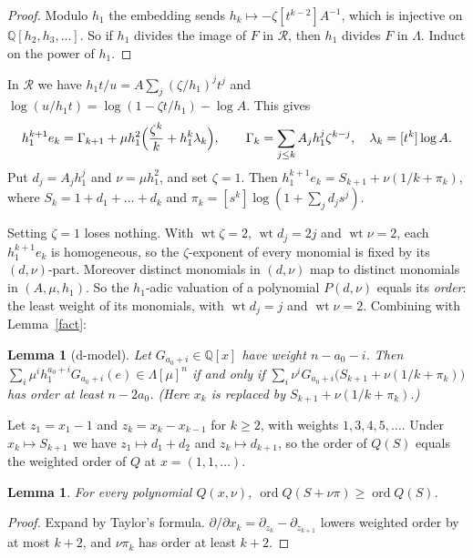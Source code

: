 \documentclass[11pt]{article}
\newtheorem{lemma}[theorem]{Lemma}
\theoremstyle{definition}
\theoremstyle{remark}
\newcommand{\Q}{\mathbb{Q}}
\newcommand{\La}{\Lambda}
\begin{document}
\begin{proof}
Modulo $h_1$ the embedding sends $h_k\mapsto-\zeta[t^{k-2}]A^{-1}$, which is injective on $\Q[h_2,h_3,\dots]$. So if
$h_1$ divides the image of $F$ in $\mathcal R$, then $h_1$ divides $F$ in $\La$. Induct on the power of $h_1$.
\end{proof}

In $\mathcal R$ we have $h_1t/u=A\sum_j(\zeta/h_1)^jt^j$ and $\log(u/h_1t)=\log(1-\zeta t/h_1)-\log A$. This gives
\[
  h_1^{k+1}e_k=\Gamma_{k+1}+\mu h_1^2\Bigl(\frac{\zeta^k}{k}+h_1^k\lambda_k\Bigr),\qquad
  \Gamma_k=\sum_{j\le k}A_jh_1^j\zeta^{k-j},\quad \lambda_k=[t^k]\log A .
\]
Put $d_j=A_jh_1^j$ and $\nu=\mu h_1^2$, and set $\zeta=1$. Then $h_1^{k+1}e_k=S_{k+1}+\nu(1/k+\pi_k)$, where
$S_k=1+d_1+\dots+d_k$ and $\pi_k=[s^k]\log(1+\sum_jd_js^j)$.

Setting $\zeta=1$ loses nothing. With $\operatorname{wt}\zeta=2$, $\operatorname{wt}d_j=2j$ and
$\operatorname{wt}\nu=2$, each $h_1^{k+1}e_k$ is homogeneous, so the $\zeta$-exponent of every monomial is fixed by
its $(d,\nu)$-part. Moreover distinct monomials in $(d,\nu)$ map to distinct monomials in $(A,\mu,h_1)$. So the
$h_1$-adic valuation of a polynomial $P(d,\nu)$ equals its \emph{order}: the least weight of its monomials, with
$\operatorname{wt}d_j=j$ and $\operatorname{wt}\nu=2$. Combining with Lemma~\ref{fact}:

\begin{lemma}[d-model]\label{dmodel}
Let $G_{a_0+i}\in\Q[x]$ have weight $n-a_0-i$. Then
$\sum_i\mu^ih_1^{a_0+i}G_{a_0+i}(e)\in\La[\mu]^n$ if and only if
$\sum_i\nu^iG_{a_0+i}\bigl(S_{k+1}+\nu(1/k+\pi_k)\bigr)$ has order at least $n-2a_0$. (Here $x_k$ is replaced by
$S_{k+1}+\nu(1/k+\pi_k)$.)
\end{lemma}

Let $z_1=x_1-1$ and $z_k=x_k-x_{k-1}$ for $k\ge2$, with weights $1,3,4,5,\dots$. Under $x_k\mapsto S_{k+1}$ we
have $z_1\mapsto d_1+d_2$ and $z_k\mapsto d_{k+1}$, so the order of $Q(S)$ equals the weighted order of $Q$ at
$x=(1,1,\dots)$.

\begin{lemma}\label{harmless}
For every polynomial $Q(x,\nu)$, $\operatorname{ord}Q(S+\nu\pi)\ge\operatorname{ord}Q(S)$.
\end{lemma}

\begin{proof}
Expand by Taylor's formula. $\partial/\partial x_k=\partial_{z_k}-\partial_{z_{k+1}}$ lowers weighted order by at
most $k+2$, and $\nu\pi_k$ has order at least $k+2$.
\end{proof}
\end{document}
